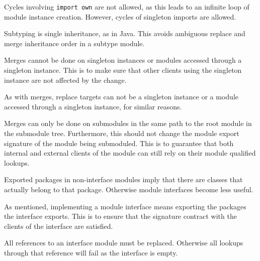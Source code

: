
Cycles involving \texttt{import own} are not allowed, as this leads to an infinite loop of
module instance creation. However, cycles of singleton imports are allowed.

Subtyping is single inheritance, as in Java. This avoids ambiguous replace and
merge inheritance order in a subtype module.

Merges cannot be done on singleton instances or modules accessed through a
singleton instance. This is to make sure that other clients using the singleton
instance are not affected by the change.

As with merges, replace targets can not be a singleton instance or a module
accessed through a singleton instance, for similar reasons. 

Merges can only be done on submodules in the same path to the root module in
the submodule tree. Furthermore, this should not change the module export signature
of the module being submoduled. This is to guarantee that both internal and external
clients of the module can still rely on their module qualified lookups.

Exported packages in non-interface modules imply that there are classes that actually 
belong to that package. Otherwise module interfaces become less useful.

As mentioned, implementing a module interface means exporting the packages the interface
exports. This is to ensure that the signature contract with the clients of
the interface are satisfied.

All references to an interface module must be replaced. Otherwise all lookups through 
that reference will fail as the interface is empty. 